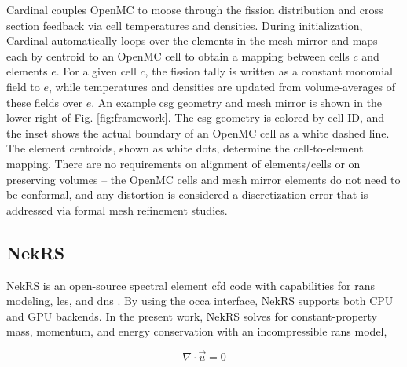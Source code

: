 \documentclass[3p,,preprint,11pt]{elsarticle}
\begin{document}
Cardinal couples OpenMC to \gls{moose} through the fission distribution and cross section feedback via cell temperatures and densities. During initialization, Cardinal automatically loops over the elements in the mesh mirror and maps each by centroid to an OpenMC cell to obtain a mapping between cells $c$ and elements $e$. For a given cell $c$, the fission tally is written as a constant monomial field to $e$, while temperatures and densities are updated from volume-averages of these fields over $e$. An example \gls{csg} geometry and mesh mirror is shown in the lower right of Fig. \ref{fig:framework}. The \gls{csg} geometry is colored by cell ID, and the inset shows the actual boundary of an OpenMC cell as a white dashed line. The element centroids, shown as white dots, determine the cell-to-element mapping. There are no requirements on alignment of elements/cells or on preserving volumes -- the OpenMC cells and mesh mirror elements do not need to be conformal, and any distortion is considered a discretization error that is addressed via formal mesh refinement studies.


\subsection{NekRS}
\label{sec:nekrs}

NekRS is an open-source spectral element \gls{cfd} code with capabilities for \gls{rans} modeling, \gls{les}, and \gls{dns} \cite{nekrs}. By using the \gls{occa} interface, NekRS supports both CPU and GPU backends. In the present work, NekRS solves for constant-property mass, momentum, and energy conservation with an incompressible \gls{rans} model,

\begin{equation}
\nabla\cdot\vec{u}=0
\end{equation}
\end{document}
